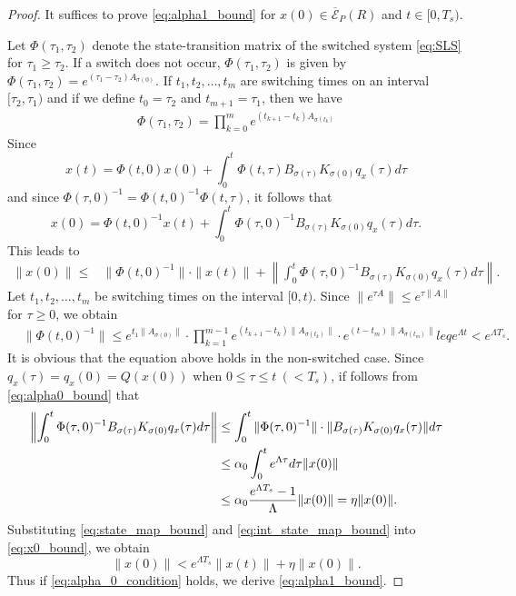 \documentclass[a4, 11pt]{article}
\begin{document}
\begin{proof}
It suffices to prove \eqref{eq:alpha1_bound} for
$x(0) \in \overline{\mathcal{E}}_P(R)$ and 
$t \in [0,T_s)$.

Let $\Phi(\tau_1,\tau_2)$ denote the state-transition matrix of 
the switched system \eqref{eq:SLS}
for $\tau_1 \geq \tau_2$.
If a switch does not occur, $\Phi(\tau_1,\tau_2)$ is given by 
$\Phi(\tau_1,\tau_2) = e^{(\tau_1-\tau_2)A_{\sigma(0)}}$.
If $t_1,t_2,\dots, t_m$ are switching times on an interval $[\tau_2,\tau_1)$
and if we define $t_0=\tau_2$ and $t_{m+1}=\tau_1$, then
we have
\begin{align*}
\Phi(\tau_1,\tau_2) = 
\prod_{k=0}^{m} e^{(t_{k+1} - t_k)A_{\sigma(t_k)} }
\end{align*}
Since
\begin{equation}
\label{eq:state_t}
x(t) = \Phi(t,0) x(0) + \int^{t}_0 \Phi(t,\tau)
B_{\sigma(\tau)} K_{\sigma(0)} q_x(\tau) d \tau
\end{equation}
and since $\Phi(\tau,0)^{-1} = \Phi(t,0)^{-1}\Phi(t,\tau)$, it follows that
\begin{equation*}
x(0) = \Phi(t,0)^{-1} x(t) + \int^{t}_0 \Phi(\tau,0)^{-1}
B_{\sigma(\tau)} K_{\sigma(0)} q_x(\tau) d \tau.
\end{equation*}
This leads to
\begin{align}
\|x(0)\| \leq &\|\Phi(t,0)^{-1}\| \cdot \|x(t)\| + \left\| \int^{t}_0 \Phi(\tau,0)^{-1}
B_{\sigma(\tau)} K_{\sigma(0)} q_x(\tau) d \tau \right\|.
\label{eq:x0_bound}
\end{align}
Let $t_1,t_2,\dots, t_m$ be switching times on the interval $[0,t)$.
Since $\| e^{\tau A}\| \leq e^{\tau\|A\|}$ for $\tau \geq 0$,
we obtain
\begin{align}
&\|\Phi(t,0)^{-1} \| \leq
e^{t_1\| A_{\sigma(0)} \|} \cdot
\prod_{k=1}^{m-1}
e^{(t_{k+1} - t_{k}) \| A_{\sigma(t_{k})} \| } \cdot
e^{(t - t_m) \| A_{\sigma(t_m)} \| } leq
e^{\Lambda t} < e^{\Lambda T_s} \label{eq:state_map_bound}.
\end{align}
It is obvious that the equation above holds in the non-switched case.
Since $q_x(\tau) = q_x(0) = Q(x(0))$ when $0 \leq \tau \leq t~(< T_s)$, 
if follows from \eqref{eq:alpha0_bound} that
\begin{align}
\left\| \int^{t}_0 \Phi(\tau,0)^{-1}
B_{\sigma(\tau)} K_{\sigma(0)} q_x(\tau) d \tau \right\| 
&\leq
\int^{t}_0
\|\Phi(\tau, 0)^{-1} \| \cdot \|B_{\sigma(\tau)} K_{\sigma(0)} q_x(\tau) \| d\tau 
\notag \\
&\leq
\alpha_0 \int^{t}_0 e^{\Lambda \tau} d\tau  \|x(0)\| \notag \\
&\leq
\alpha_0  \frac{e^{\Lambda T_s} - 1}{\Lambda}  \|x(0)\|
= \eta \|x(0)\|.
\label{eq:int_state_map_bound}
\end{align}
Substituting \eqref{eq:state_map_bound} and \eqref{eq:int_state_map_bound}
into \eqref{eq:x0_bound},
we obtain
\begin{equation*}
\|x(0)\| < e^{\Lambda T_s} \|x(t)\| + 
\eta \|x(0)\|.
\end{equation*}
Thus if \eqref{eq:alpha_0_condition} holds, we derive
\eqref{eq:alpha1_bound}.
\end{proof}
\end{document}
